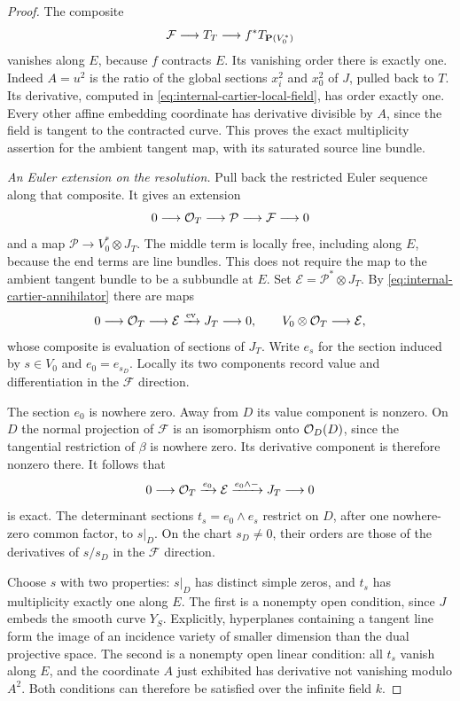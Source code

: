\begin{proof}
The composite
\[
 \mathcal F\longrightarrow T_T
 \longrightarrow f^*T_{\mathbf P(V_0^*)}
\]
vanishes along $E$, because $f$ contracts $E$. Its vanishing
order there is exactly one. Indeed $A=u^2$ is the ratio of the
global sections $x_i^2$ and $x_0^2$ of $J$, pulled back to $T$.
Its derivative, computed in
\eqref{eq:internal-cartier-local-field}, has order exactly one.
Every other affine embedding coordinate has derivative divisible
by $A$, since the field is tangent to the contracted curve.
This proves the exact multiplicity assertion for the ambient
tangent map, with its saturated source line bundle.

\emph{An Euler extension on the resolution.}
Pull back the restricted Euler sequence along that composite.
It gives an extension
\[
 0\longrightarrow\mathcal O_T\longrightarrow\mathcal P
 \longrightarrow\mathcal F\longrightarrow0
\]
and a map $\mathcal P\to V_0^*\otimes J_T$.
The middle term is locally free, including along $E$, because
the end terms are line bundles. This does not require the map
to the ambient tangent bundle to be a subbundle at $E$.
Set $\mathcal E=\mathcal P^*\otimes J_T$. By
\eqref{eq:internal-cartier-annihilator} there are maps
\[
 0\longrightarrow\mathcal O_T\longrightarrow\mathcal E
 \xrightarrow{\mathrm{ev}}J_T\longrightarrow0,
 \qquad V_0\otimes\mathcal O_T\longrightarrow\mathcal E,
\]
whose composite is evaluation of sections of $J_T$.
Write $e_s$ for the section induced by $s\in V_0$ and
$e_0=e_{s_D}$. Locally its two components record value and
differentiation in the $\mathcal F$ direction.

The section $e_0$ is nowhere zero. Away from $D$ its value
component is nonzero. On $D$ the normal projection of
$\mathcal F$ is an isomorphism onto $\mathcal O_D(D)$, since the
tangential restriction of $\beta$ is nowhere zero. Its
derivative component is therefore nonzero there. It follows that
\begin{equation}\label{eq:internal-cartier-determinant-extension}
 0\longrightarrow\mathcal O_T\xrightarrow{e_0}\mathcal E
 \xrightarrow{e_0\wedge-}J_T\longrightarrow0
\end{equation}
is exact. The determinant sections $t_s=e_0\wedge e_s$ restrict
on $D$, after one nowhere-zero common factor, to $s|_D$.
On the chart $s_D\ne0$, their orders are those of the derivatives
of $s/s_D$ in the $\mathcal F$ direction.

Choose $s$ with two properties: $s|_D$ has distinct simple zeros,
and $t_s$ has multiplicity exactly one along $E$.
The first is a nonempty open condition, since $J$ embeds the
smooth curve $Y_S$. Explicitly, hyperplanes containing a tangent
line form the image of an incidence variety of smaller dimension
than the dual projective space. The second is a nonempty open
linear condition: all $t_s$ vanish along $E$, and the coordinate
$A$ just exhibited has derivative not vanishing modulo $A^2$.
Both conditions can therefore be satisfied over the infinite
field $k$.


\end{proof}
